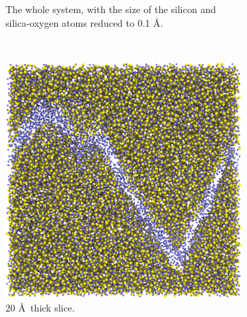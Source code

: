 \begin{figure}[!p]
\begin{subfigure}[t]{\myfigwidth}
        \caption{The whole system, with the size of the silicon and silica-oxygen atoms reduced to 0.1 \AA.}%
    \end{subfigure}%
    \vspace{10pt}\\%
    \begin{subfigure}[t]{\myfigwidth}%
        \centering%
        \includegraphics[width=\textwidth]{images/systems/trimmed-rough_fracture04_05_20ang}%
        \caption{20 \AA\ thick slice.}%
    \end{subfigure}%
    \hfill%
        \begin{subfigure}[t]{\myfigwidth}%
        \centering%

\end{subfigure}
\end{figure}
